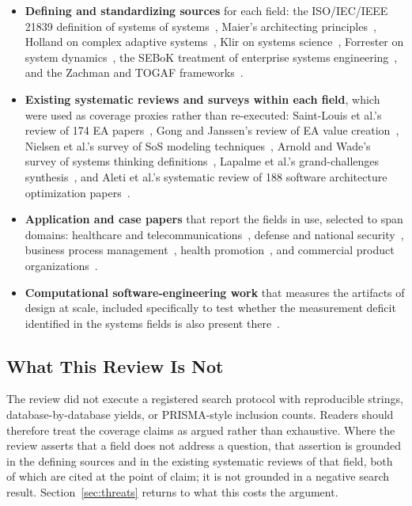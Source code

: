\documentclass{csimq}
\begin{document}
\begin{itemize}
\item \textbf{Defining and standardizing sources} for each field: the
ISO/IEC/IEEE 21839 definition of systems of systems~\cite{iso21839}, Maier's
architecting principles~\cite{maier1998}, Holland on complex adaptive
systems~\cite{holland1992}, Klir on systems science~\cite{klir2001}, Forrester
on system dynamics~\cite{forrester2009}, the SEBoK treatment of enterprise
systems engineering~\cite{sebok_ese2024}, and the Zachman and TOGAF
frameworks~\cite{zachman_nd,bente2012}.

\item \textbf{Existing systematic reviews and surveys within each field},
which were used as coverage proxies rather than re-executed: Saint-Louis et
al.'s review of 174 EA papers~\cite{saintlouis2017}, Gong and Janssen's review
of EA value creation~\cite{gong2019}, Nielsen et al.'s survey of SoS modeling
techniques~\cite{nielsen2015}, Arnold and Wade's survey of systems thinking
definitions~\cite{arnold2015}, Lapalme et al.'s grand-challenges
synthesis~\cite{lapalme2016}, and Aleti et al.'s systematic review of 188
software architecture optimization papers~\cite{aleti2013}.

\item \textbf{Application and case papers} that report the fields in use,
selected to span domains: healthcare and telecommunications~\cite{kotze2016},
defense and national security~\cite{morgan2023}, business process
management~\cite{fleischmann2016}, health promotion~\cite{vanbeurden2011}, and
commercial product organizations~\cite{dunne2018,monat2020}.

\item \textbf{Computational software-engineering work} that measures the
artifacts of design at scale, included specifically to test whether the
measurement deficit identified in the systems fields is also present
there~\cite{aleti2013,mahadi2021,tawosi2022,zangari2023,kleebaum2021,sharma2021,dhaouadi2023}.
\end{itemize}

\subsection{What This Review Is Not}

The review did not execute a registered search protocol with reproducible
strings, database-by-database yields, or PRISMA-style inclusion counts. Readers should
therefore treat the coverage claims as argued rather than
exhaustive. Where the review asserts that a field does not address a
question, that assertion is grounded in the defining sources and in the existing
systematic reviews of that field, both of which are cited at the point of
claim; it is not grounded in a negative search result. Section~\ref{sec:threats}
returns to what this costs the argument.
\end{document}
